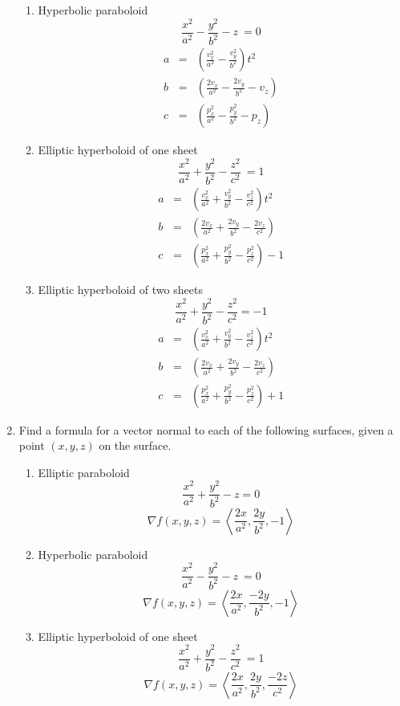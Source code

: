 \documentclass{article}
\newcommand{\vect}[1]{\left\langle #1 \right\rangle}
\begin{document}
\begin{enumerate}
\begin{enumerate}
\item Hyperbolic paraboloid \[\frac{x^2}{a^2} - \frac{y^2}{b^2} - z\ = 0\]
  \begin{eqnarray*}
a&=&\left(\frac{v_x^2}{a^2} - \frac{v_y^2}{b^2}\right)t^2\\
b&=&\left(\frac{2v_x}{a^2} - \frac{2v_y}{b^2} - v_z\right)\\
c&=&\left(\frac{p_x^2}{a^2} - \frac{p_y^2}{b^2} - {p_z}\right)
\end{eqnarray*}


\item Elliptic hyperboloid of one sheet
  \[\frac{x^2}{a^2} + \frac{y^2}{b^2} - \frac{z^2}{c^2}\ = 1\]
  \begin{eqnarray*}
a&=&\left(\frac{v_x^2}{a^2} + \frac{v_y^2}{b^2} - \frac{v_z^2}{c^2}\right)t^2\\
b&=&\left(\frac{2v_x}{a^2} + \frac{2v_y}{b^2} - \frac{2v_z}{c^2}\right)\\
c&=&\left(\frac{p_x^2}{a^2} + \frac{p_y^2}{b^2} - \frac{p_z^2}{c^2}\right)-1
\end{eqnarray*}
  

  \item Elliptic hyperboloid of two sheets
    \[ \frac{x^2}{a^2} + \frac{y^2}{b^2} - \frac{z^2}{c^2} = -1\]
  \begin{eqnarray*}
a&=&\left(\frac{v_x^2}{a^2} + \frac{v_y^2}{b^2} - \frac{v_z^2}{c^2}\right)t^2\\
b&=&\left(\frac{2v_x}{a^2} + \frac{2v_y}{b^2} - \frac{2v_z}{c^2}\right)\\
c&=&\left(\frac{p_x^2}{a^2} + \frac{p_y^2}{b^2} - \frac{p_z^2}{c^2}\right)+1
\end{eqnarray*}
  \end{enumerate}
  
  
\item Find a formula for a vector normal to each of the following
  surfaces, given a point $(x,y,z)$ on the surface.
  \begin{enumerate}
  \item Elliptic paraboloid \[\frac{x^2}{a^2} + \frac{y^2}{b^2} - z = 0\]
    \[
    \nabla f(x,y,z) = \vect{\frac{2x}{a^2}, \frac{2y}{b^2}, -1}
    \]

  \item Hyperbolic paraboloid \[\frac{x^2}{a^2} - \frac{y^2}{b^2} - z\ = 0\]
    \[
    \nabla f(x,y,z) = \vect{\frac{2x}{a^2}, \frac{-2y}{b^2}, -1}
    \]

  \item Elliptic hyperboloid of one sheet
    \[\frac{x^2}{a^2} + \frac{y^2}{b^2} - \frac{z^2}{c^2}\ = 1\]
    \[
    \nabla f(x,y,z) = \vect{\frac{2x}{a^2}, \frac{2y}{b^2}, \frac{-2z}{c^2}}
    \]


\end{enumerate}
\end{enumerate}
\end{document}
